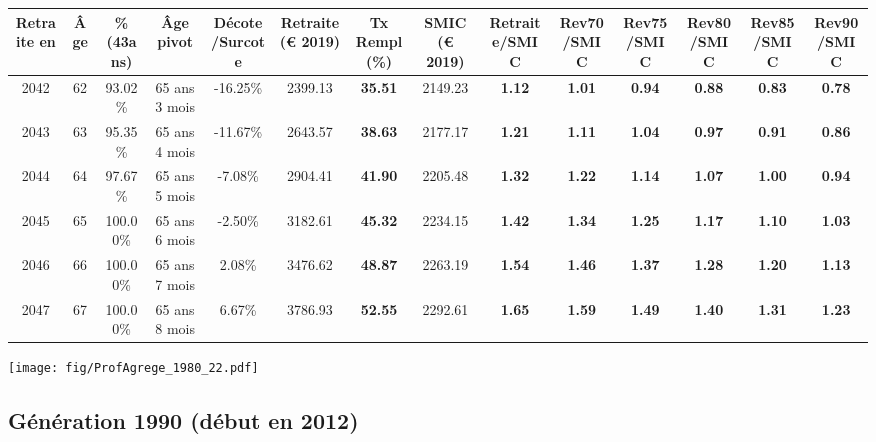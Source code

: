 \begin{adjustbox}{max width=\textwidth} 
\begin{tabular}[htb]{|c|c||c|c|c||c|c||c||c|c|c|c|c|c|} 
\hline 
 Retraite en &  Âge &  \%(43ans) &  Âge pivot &  Décote/Surcote &  Retraite (\euro{} 2019) &  Tx Rempl(\%) &  SMIC (\euro{} 2019) &  Retraite/SMIC &  Rev70/SMIC &  Rev75/SMIC &  Rev80/SMIC &  Rev85/SMIC &  Rev90/SMIC \\ 
\hline \hline 
 2042 &  62 &  93.02\% &  65 ans 3 mois &  -16.25\% &  2399.13 &  {\bf 35.51} &  2149.23 &  {\bf 1.12} &  {\bf 1.01} &  {\bf {\color{red} 0.94}} &  {\bf {\color{red} 0.88}} &  {\bf {\color{red} 0.83}} &  {\bf {\color{red} 0.78}} \\ 
\hline 
 2043 &  63 &  95.35\% &  65 ans 4 mois &  -11.67\% &  2643.57 &  {\bf 38.63} &  2177.17 &  {\bf 1.21} &  {\bf 1.11} &  {\bf 1.04} &  {\bf {\color{red} 0.97}} &  {\bf {\color{red} 0.91}} &  {\bf {\color{red} 0.86}} \\ 
\hline 
 2044 &  64 &  97.67\% &  65 ans 5 mois &  -7.08\% &  2904.41 &  {\bf 41.90} &  2205.48 &  {\bf 1.32} &  {\bf 1.22} &  {\bf 1.14} &  {\bf 1.07} &  {\bf 1.00} &  {\bf {\color{red} 0.94}} \\ 
\hline 
 2045 &  65 &  100.00\% &  65 ans 6 mois &  -2.50\% &  3182.61 &  {\bf 45.32} &  2234.15 &  {\bf 1.42} &  {\bf 1.34} &  {\bf 1.25} &  {\bf 1.17} &  {\bf 1.10} &  {\bf 1.03} \\ 
\hline 
 2046 &  66 &  100.00\% &  65 ans 7 mois &  2.08\% &  3476.62 &  {\bf 48.87} &  2263.19 &  {\bf 1.54} &  {\bf 1.46} &  {\bf 1.37} &  {\bf 1.28} &  {\bf 1.20} &  {\bf 1.13} \\ 
\hline 
 2047 &  67 &  100.00\% &  65 ans 8 mois &  6.67\% &  3786.93 &  {\bf 52.55} &  2292.61 &  {\bf 1.65} &  {\bf 1.59} &  {\bf 1.49} &  {\bf 1.40} &  {\bf 1.31} &  {\bf 1.23} \\ 
\hline 
\hline 
\end{tabular} 
\end{adjustbox} 
 
 \vspace{0.1cm} 

 \begin{center}\texttt{[image: fig/ProfAgrege\_1980\_22.pdf]}\end{center} \label{fig/ProfAgrege_1980_22.pdf} 

\newpage 
 
\subsection{Génération 1990 (début en 2012)} 


